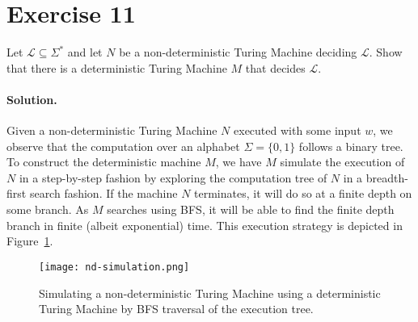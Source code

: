 \documentclass[11pt]{llncs}
\begin{document}
\section*{Exercise 11}
Let $\mathcal{L} \subseteq \Sigma^*$ and let $N$ be a non-deterministic Turing
Machine deciding $\mathcal{L}$. Show that there is a deterministic Turing
Machine $M$ that decides $\mathcal{L}$.

\paragraph{Solution.}

Given a non-deterministic Turing Machine $N$ executed with some input $w$, we
observe that the computation over an alphabet $\Sigma = \{0, 1\}$ follows a
binary tree. To construct the deterministic machine $M$, we have $M$ simulate
the execution of $N$ in a step-by-step fashion by exploring the computation tree
of $N$ in a breadth-first search fashion. If the machine $N$ terminates, it will
do so at a finite depth on some branch. As $M$ searches using BFS, it will be
able to find the finite depth branch in finite (albeit exponential) time. This
execution strategy is depicted in Figure~\ref{fig.simulation}.

\begin{figure}
    \caption{Simulating a non-deterministic Turing Machine using a
    deterministic Turing Machine by BFS traversal of the execution tree.}
    \centering
    \texttt{[image: nd-simulation.png]}
    \label{fig.simulation}
\end{figure}
\end{document}
